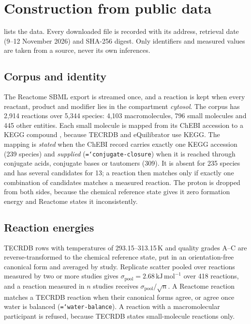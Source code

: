 \documentclass[5p]{elsarticle}
\theoremstyle{definition}
\theoremstyle{plain}
\newcommand{\kJ}{\ensuremath{\,\mathrm{kJ\,mol^{-1}}}}
\newcommand{\st}[1]{\textsf{#1}}            %
\newcommand{\breakingtt}[1]{\texttt{\hyphenchar\font=`\-\relax #1}}  %
\newcommand{\conv}[1]{\breakingtt{#1}}      %
\begin{document}
\section{Construction from public data}
\label{sec:construction}

 lists the data.
Every downloaded file is recorded with its address, retrieval date (9--12 November 2026) and SHA-256 digest.
Only identifiers and measured values are taken from a source, never its own inferences.


\subsection{Corpus and identity}
\label{sec:corpus}

The Reactome SBML export is streamed once, and a reaction is kept when every reactant, product and modifier lies in the compartment \emph{cytosol}.
The corpus has 2{,}914 reactions over 5{,}344 species: 4{,}103 macromolecules, 796 small molecules and 445 other entities.
Each small molecule is mapped from its ChEBI accession \citep{hastings2016chebi} to a KEGG compound \citep{kanehisa2000kegg}, because TECRDB and eQuilibrator use KEGG.
The mapping is \emph{stated} when the ChEBI record carries exactly one KEGG accession (239 species) and \emph{supplied} (\conv{conjugate-closure}) when it is reached through conjugate acids, conjugate bases or tautomers (309).
It is absent for 235 species and has several candidates for 13; a reaction then matches only if exactly one combination of candidates matches a measured reaction.
The proton is dropped from both sides, because the chemical reference state gives it zero formation energy and Reactome states it inconsistently.

\subsection{Reaction energies}
\label{sec:thermo}

TECRDB rows with temperatures of 293.15--313.15\,K and quality grades A--C are reverse-transformed to the chemical reference state, put in an orientation-free canonical form and averaged by study.
Replicate scatter pooled over reactions measured by two or more studies gives $\sigma_{\mathrm{pool}}=2.68\kJ$ over 418 reactions, and a reaction measured in $n$ studies receives $\sigma_{\mathrm{pool}}/\sqrt n$.
A Reactome reaction matches a TECRDB reaction when their canonical forms agree, or agree once water is balanced (\conv{water-balance}).
A reaction with a macromolecular participant is \st{refused}, because TECRDB states small-molecule reactions only.
\end{document}
